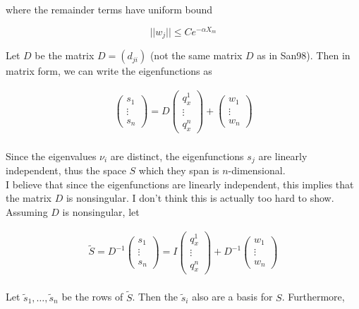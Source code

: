 \documentclass[12pt]{article}
\begin{document}
where the remainder terms have uniform bound 

\[
||w_j|| \leq C e^{-\alpha X_m}
\]

Let $D$ be the matrix $D = (d_{ji})$ (not the same matrix $D$ as in San98). Then in matrix form, we can write the eigenfunctions as 

\begin{align*}
\begin{pmatrix}s_1 \\ \vdots \\ s_n \end{pmatrix} 
= D \begin{pmatrix}q^1_x \\ \vdots \\ q^n_x \end{pmatrix} 
+ \begin{pmatrix}w_1 \\ \vdots \\ w_n \end{pmatrix}  \\ 
\end{align*}

Since the eigenvalues $\nu_i$ are distinct, the eigenfunctions $s_j$ are linearly independent, thus the space $S$ which they span is $n$-dimensional.\\ 

I believe that since the eigenfunctions are linearly independent, this implies that the matrix $D$ is nonsingular. I don't think this is actually too hard to show.\\

Assuming $D$ is nonsingular, let  

\begin{align*}
\tilde{S} = 
D^{-1} \begin{pmatrix}s_1 \\ \vdots \\ s_n \end{pmatrix} 
= I \begin{pmatrix}q^1_x \\ \vdots \\ q^n_x \end{pmatrix} 
+ D^{-1} \begin{pmatrix}w_1 \\ \vdots \\ w_n \end{pmatrix}  \\ 
\end{align*}

Let $\tilde{s}_1, \dots, \tilde{s}_n$ be the rows of $\tilde{S}$. Then the $\tilde{s}_i$ also are a basis for $S$. Furthermore, 
\end{document}
